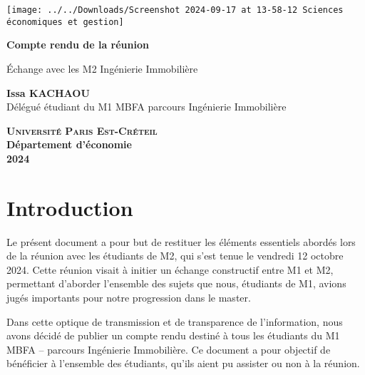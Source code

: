 \documentclass[a4paper, 12pt]{report}
\begin{document}
	
\begin{titlepage}
	\centering
	\begin{center}
		\texttt{[image: ../../Downloads/Screenshot 2024-09-17 at 13-58-12 Sciences économiques et gestion]}
	\end{center}
	\vspace*{2cm}
	
	\Huge
	
	\textbf{Compte rendu de la réunion}
	\vspace{1.5cm}
	
	\Large
	Échange avec les M2 Ingénierie Immobilière
	
	\vspace{2cm}
	
	\textbf{Issa KACHAOU} \\
	{\normalsize Délégué étudiant du M1 MBFA parcours Ingénierie Immobilière}

	
	\vfill
	
	\Large

\textsc{\textbf{Université Paris Est-Créteil}}	 \\
	\textbf{Département d'économie} \\
	\textbf{2024}
	
\end{titlepage}
\thispagestyle{empty}
\newpage
\clearpage
\mbox{}
\thispagestyle{empty}

\tableofcontents

\thispagestyle{empty}
\newpage
\mbox{}
\thispagestyle{empty} %

\chapter{Introduction}

Le présent document a pour but de restituer les éléments essentiels abordés lors de la réunion avec les étudiants de M2, qui s’est tenue le vendredi 12 octobre 2024. Cette réunion visait à initier un échange constructif entre M1 et M2, permettant d’aborder l’ensemble des sujets que nous, étudiants de M1, avions jugés importants pour notre progression dans le master.

Dans cette optique de transmission et de transparence de l’information, nous avons décidé de publier un compte rendu destiné à tous les étudiants du M1 MBFA – parcours Ingénierie Immobilière. Ce document a pour objectif de bénéficier à l’ensemble des étudiants, qu’ils aient pu assister ou non à la réunion.
\end{document}
